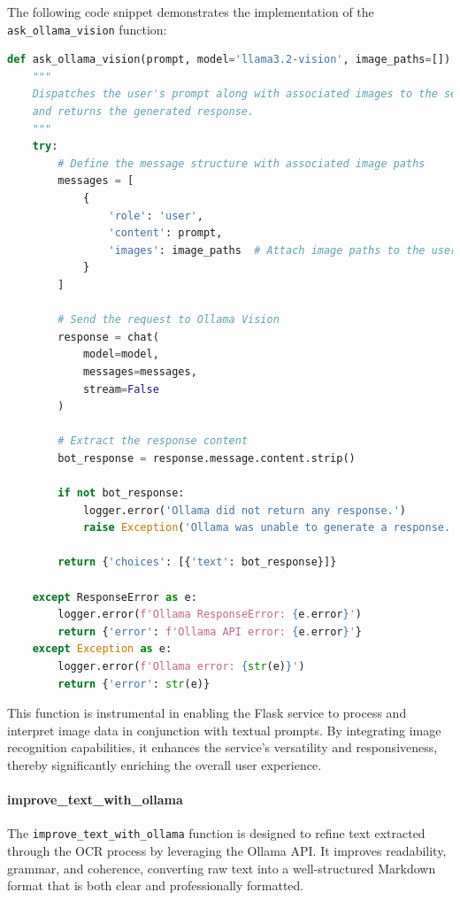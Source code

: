 The following code snippet demonstrates the implementation of the \texttt{ask\_ollama\_vision} function:

\begin{lstlisting}[language=Python, caption={ask\_ollama\_vision Utility Function}]
def ask_ollama_vision(prompt, model='llama3.2-vision', image_paths=[]):
    """
    Dispatches the user's prompt along with associated images to the selected Ollama Vision model,
    and returns the generated response.
    """
    try:
        # Define the message structure with associated image paths
        messages = [
            {
                'role': 'user',
                'content': prompt,
                'images': image_paths  # Attach image paths to the user message
            }
        ]

        # Send the request to Ollama Vision
        response = chat(
            model=model,
            messages=messages,
            stream=False
        )

        # Extract the response content
        bot_response = response.message.content.strip()

        if not bot_response:
            logger.error('Ollama did not return any response.')
            raise Exception('Ollama was unable to generate a response.')

        return {'choices': [{'text': bot_response}]}

    except ResponseError as e:
        logger.error(f'Ollama ResponseError: {e.error}')
        return {'error': f'Ollama API error: {e.error}'}
    except Exception as e:
        logger.error(f'Ollama error: {str(e)}')
        return {'error': str(e)}
\end{lstlisting}

This function is instrumental in enabling the Flask service to process and interpret image data in conjunction with textual prompts. By integrating image recognition capabilities, it enhances the service's versatility and responsiveness, thereby significantly enriching the overall user experience.

\paragraph{improve\_text\_with\_ollama}

The \texttt{improve\_text\_with\_ollama} function is designed to refine text extracted through the OCR process by leveraging the Ollama API. It improves readability, grammar, and coherence, converting raw text into a well-structured Markdown format that is both clear and professionally formatted.

